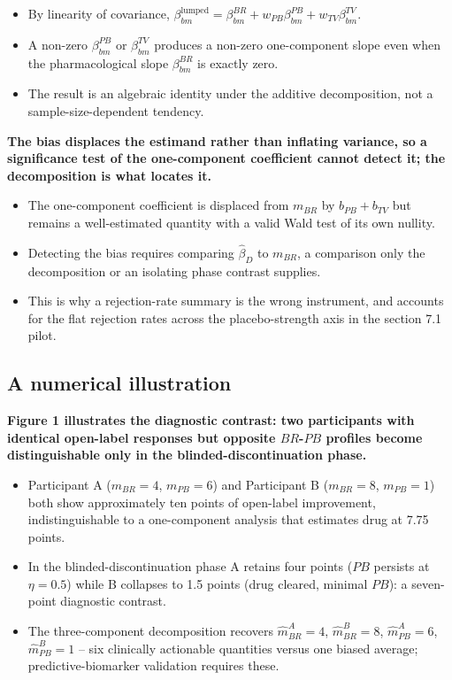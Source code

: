 \documentclass[
  11pt,
]{article}
\begin{document}
\begin{itemize}\setlength{\itemsep}{2pt}\setlength{\parskip}{0pt}
\item By linearity of covariance, $\beta_{bm}^{\text{lumped}} = \beta_{bm}^{BR} + w_{PB}\beta_{bm}^{PB} + w_{TV}\beta_{bm}^{TV}$.
\item A non-zero $\beta_{bm}^{PB}$ or $\beta_{bm}^{TV}$ produces a non-zero one-component slope even when the pharmacological slope $\beta_{bm}^{BR}$ is exactly zero.
\item The result is an algebraic identity under the additive decomposition, not a sample-size-dependent tendency.
\end{itemize}

\textbf{The bias displaces the estimand rather than inflating variance, so a significance test of the one-component coefficient cannot detect it; the decomposition is what locates it.}

\begin{itemize}\setlength{\itemsep}{2pt}\setlength{\parskip}{0pt}
\item The one-component coefficient is displaced from $m_{BR}$ by $b_{PB} + b_{TV}$ but remains a well-estimated quantity with a valid Wald test of its own nullity.
\item Detecting the bias requires comparing $\hat\beta_D$ to $m_{BR}$, a comparison only the decomposition or an isolating phase contrast supplies.
\item This is why a rejection-rate summary is the wrong instrument, and accounts for the flat rejection rates across the placebo-strength axis in the section 7.1 pilot.
\end{itemize}

\subsection{A numerical illustration}\label{a-numerical-illustration}

\textbf{Figure 1 illustrates the diagnostic contrast: two participants with identical open-label responses but opposite $BR$-$PB$ profiles become distinguishable only in the blinded-discontinuation phase.}

\begin{itemize}\setlength{\itemsep}{2pt}\setlength{\parskip}{0pt}
\item Participant A ($m_{BR} = 4$, $m_{PB} = 6$) and Participant B ($m_{BR} = 8$, $m_{PB} = 1$) both show approximately ten points of open-label improvement, indistinguishable to a one-component analysis that estimates drug at 7.75 points.
\item In the blinded-discontinuation phase A retains four points ($PB$ persists at $\eta = 0.5$) while B collapses to 1.5 points (drug cleared, minimal $PB$): a seven-point diagnostic contrast.
\item The three-component decomposition recovers $\hat{m}_{BR}^A = 4$, $\hat{m}_{BR}^B = 8$, $\hat{m}_{PB}^A = 6$, $\hat{m}_{PB}^B = 1$ -- six clinically actionable quantities versus one biased average; predictive-biomarker validation requires these.
\end{itemize}
\end{document}
